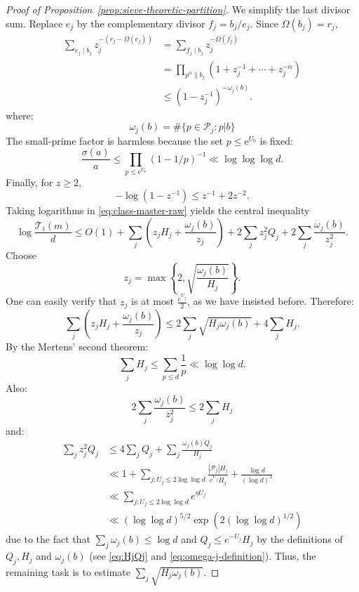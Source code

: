 \documentclass[10pt,a4paper]{amsart}
\begin{document}
\begin{proof}[Proof of Proposition~\ref{prop:sieve-theoretic-partition}]
We simplify the last divisor sum.  Replace $e_j$ by the complementary divisor
$f_j=b_j/e_j$.  Since $\Omega(b_j)=r_j$,
\begin{align*}
 \sum_{e_j\mid b_j}z_j^{-(r_j-\Omega(e_j))}
 &=\sum_{f_j\mid b_j}z_j^{-\Omega(f_j)}\\
 &=\prod_{p^\alpha\parallel b_j}
   (1+z_j^{-1}+\cdots+z_j^{-\alpha})\\
 &\le (1-z_j^{-1})^{-\omega_j(b)}.
\end{align*}
where:
\begin{equation} \label{eq:omega-j-definition}
  \omega_j(b) = \# \{ p \in \mathcal{P}_j : p | b \}
\end{equation}
The small-prime factor is harmless because the set $p\le\mathrm e^{U_0}$ is fixed:
\[
 \frac{\sigma(a)}a
 \le\prod_{p\le\mathrm e^{U_0}}(1-1/p)^{-1} \ll \log \log \log d.
\]
Finally, for $z\ge2$,
\[
 -\log(1-z^{-1})\le z^{-1}+2z^{-2}.
\]
Taking logarithms in \eqref{eq:class-master-raw} yields the central inequality
\begin{equation}\label{eq:central-inequality}
 \log\frac{\mathcal T_i(m)}d
 \le O(1)
 +\sum_j\left(z_jH_j+\frac{\omega_j(b)}{z_j}\right)
 +2\sum_jz_j^2Q_j
 +2\sum_j\frac{\omega_j(b)}{z_j^2}.
\end{equation}
Choose
\begin{equation}
 z_j=\max\left\{2,\sqrt{\frac{\omega_j(b)}{H_j}}\right\}.
\end{equation}
One can easily verify that $z_j$ is at most $\frac{e^{U_j}}{2}$, as we have insisted before.
Therefore:
\begin{equation}\label{eq:main-reduction}
 \sum_j\left(z_jH_j+\frac{\omega_j(b)}{z_j}\right)
 \le 2\sum_j\sqrt{H_j\omega_j(b)}+4\sum_jH_j.
\end{equation}
By the Mertens' second theorem:
\[
 \sum_jH_j\le\sum_{p\le d}\frac1p \ll \log \log d.
\]
Also:
\begin{equation}
  2 \sum_j \frac{\omega_j(b)}{z_j^2} \leq 2 \sum_j H_j
\end{equation}
and:
\begin{equation}
  \begin{aligned}
    \sum_{j} z_j^2 Q_j
    &\leq 4\sum_j Q_j+\sum_j \frac{\omega_j(b) Q_j}{H_j}\\
    &\ll 1+\sum_{j : U_j \leq 2 \log \log d}
      \frac{|\mathcal{P}_j| H_j}{e^{U_j} H_j}
      + \frac{\log d}{(\log d)^2}\\
    &\ll \sum_{j : U_j \leq 2 \log \log d} e^{\eta U_j}\\
    &\ll (\log \log d)^{5/2}
      \exp(2 (\log \log d)^{1/2})
  \end{aligned}
\end{equation}
due to the fact that $\sum_j \omega_j(b) \leq \log d$ and $Q_j \leq e^{-U_j} H_j$ by the definitions of $Q_j, H_j$ and $\omega_j(b)$ (see \eqref{eq:HjQj} and \eqref{eq:omega-j-definition}).
Thus, the remaining task is to estimate $\sum_j\sqrt{H_j\omega_j(b)}$.


\end{proof}
\end{document}
